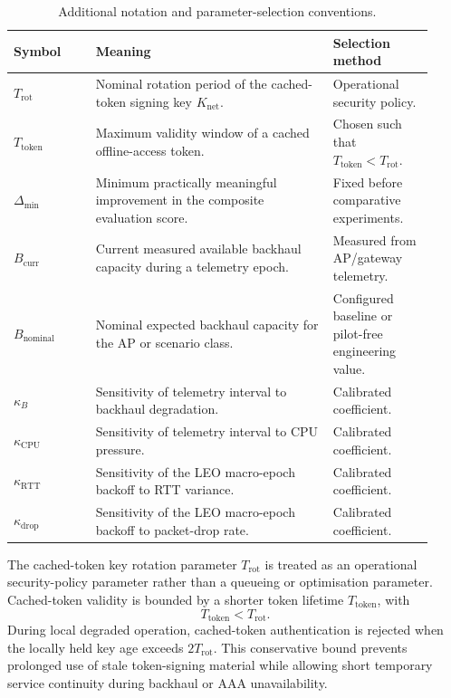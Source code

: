\begin{table}[h]
\centering
\caption{Additional notation and parameter-selection conventions.}
\label{tab:parameter_conventions}
\begin{tabular}{p{0.18\linewidth} p{0.52\linewidth} p{0.22\linewidth}}
\hline
Symbol & Meaning & Selection method \\
\hline
$T_{\mathrm{rot}}$ &
Nominal rotation period of the cached-token signing key $K_{\mathrm{net}}$. &
Operational security policy. \\

$T_{\mathrm{token}}$ &
Maximum validity window of a cached offline-access token. &
Chosen such that $T_{\mathrm{token}} < T_{\mathrm{rot}}$. \\

$\Delta_{\min}$ &
Minimum practically meaningful improvement in the composite evaluation score. &
Fixed before comparative experiments. \\

$B_{\mathrm{curr}}$ &
Current measured available backhaul capacity during a telemetry epoch. &
Measured from AP/gateway telemetry. \\

$B_{\mathrm{nominal}}$ &
Nominal expected backhaul capacity for the AP or scenario class. &
Configured baseline or pilot-free engineering value. \\

$\kappa_B$ &
Sensitivity of telemetry interval to backhaul degradation. &
Calibrated coefficient. \\

$\kappa_{\mathrm{CPU}}$ &
Sensitivity of telemetry interval to CPU pressure. &
Calibrated coefficient. \\

$\kappa_{\mathrm{RTT}}$ &
Sensitivity of the LEO macro-epoch backoff to RTT variance. &
Calibrated coefficient. \\

$\kappa_{\mathrm{drop}}$ &
Sensitivity of the LEO macro-epoch backoff to packet-drop rate. &
Calibrated coefficient. \\
\hline
\end{tabular}
\end{table}

The cached-token key rotation parameter $T_{\mathrm{rot}}$ is treated as an
operational security-policy parameter rather than a queueing or optimisation
parameter. Cached-token validity is bounded by a shorter token lifetime
$T_{\mathrm{token}}$, with
\begin{equation}
  T_{\mathrm{token}} < T_{\mathrm{rot}}.
  \label{eq:token-rotation-bound}
\end{equation}
During local degraded operation, cached-token authentication is rejected when the
locally held key age exceeds $2T_{\mathrm{rot}}$. This conservative bound prevents
prolonged use of stale token-signing material while allowing short temporary service
continuity during backhaul or AAA unavailability.

